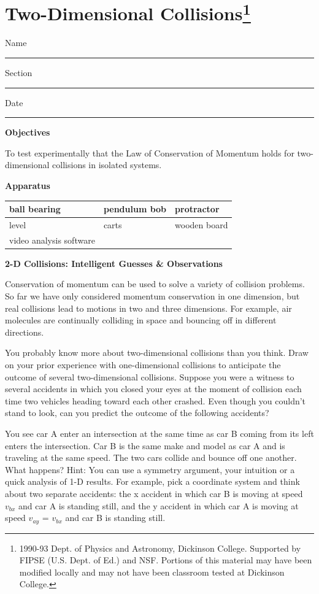 \section{Two-Dimensional Collisions\footnote{
1990-93 Dept. of Physics and Astronomy, Dickinson College. Supported by FIPSE
(U.S. Dept. of Ed.) and NSF. Portions of this material may have been modified
locally and may not have been classroom tested at Dickinson College.
}}

Name \rule{2.0in}{0.1pt}\hfill{}Section \rule{1.0in}{0.1pt}\hfill{}Date \rule{1.0in}{0.1pt}

\textbf{Objectives} 

To test experimentally that the Law of Conservation of Momentum holds for two-dimensional
collisions in isolated systems.

\textbf{Apparatus}

\begin{center}
\begin{tabular}{|l|l|l|} \hline
ball bearing            & pendulum bob & protractor \\ \hline
level                   & carts        & wooden board \\ \hline
video analysis software &              &              \\ \hline
\end{tabular}
\end{center}

\textbf{2-D Collisions: Intelligent Guesses \& Observations }

Conservation of momentum can be used to solve a variety of collision
problems. So far we have only considered momentum conservation in one dimension,
but real collisions lead to motions in two and three dimensions. For example,
air molecules are continually colliding in space and bouncing off in different
directions. 

You probably know more about two-dimensional collisions than you think. Draw
on your prior experience with one-dimensional collisions to anticipate the outcome
of several two-dimensional collisions. Suppose you were a witness to several
accidents in which you closed your eyes at the moment of collision each time
two vehicles heading toward each other crashed. Even though you couldn't stand
to look, can you predict the outcome of the following accidents?

You see car A enter an intersection at the same time as car B coming from its
left enters the intersection. Car B is the same make and model as car A and
is traveling at the same speed. The two cars collide and bounce off one another.
What happens? Hint: You can use a symmetry argument, your intuition or a quick
analysis of 1-D results. For example, pick a coordinate system and think about
two separate accidents: the x accident in which car B is moving at speed \( v_{bx} \)
and car A is standing still, and the y accident in which car A is moving at
speed \( v_{ay} \) = \( v_{bx} \) and car B is standing still. 


